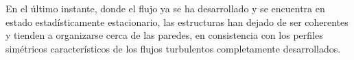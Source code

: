 En el último instante, donde el flujo ya se ha desarrollado y se encuentra en estado estadísticamente estacionario, las estructuras han dejado de ser coherentes y tienden a organizarse cerca de las paredes, en consistencia con los perfiles simétricos característicos de los flujos turbulentos completamente desarrollados.

\begin{figure}%
  \centering  
    
  

\end{figure}
